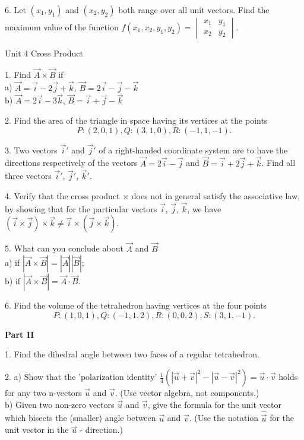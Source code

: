 \documentclass{article}
\begin{document}
6. Let $(x_{1}, y_{1})$ and $(x_{2}, y_{2})$ both range over all unit vectors.
Find the maximum value of the function $f(x_{1}, x_{2}, y_{1}, y_{2}) =
\begin{vmatrix}
x_{1} & y_{1} \\
x_{2} & y_{2}   
\end{vmatrix}$.

\bigskip

Unit 4 Cross Product

1. Find $\vec{A} \times \vec{B}$ if\\
a) $\vec{A} = \vec{i} - 2 \vec{j} + \vec{k}$, $\vec{B} = 2 \vec{i} - \vec{j} -
\vec{k}$ \\
b) $\vec{A} = 2 \vec{i} - 3 \vec{k}$, $\vec{B} = \vec{i} + \vec{j} - \vec{k}$

2. Find the area of the triangle in space having its vertices at the points
\[ P:(2,0,1), Q:(3,1,0), R:(-1,1,-1).\]

3. Two vectors $\vec{i}'$ and $\vec{j}'$ of a right-handed coordinate system
are to have the directions respectively of the vectors $\vec{A} = 2 \vec{i} -
\vec{j}$ and $\vec{B} = \vec{i} + 2 \vec{j} + \vec{k}$. Find all three vectors
$\vec{i}'$, $\vec{j}'$, $\vec{k}'$.

4. Verify that the cross product $\times$ does not in general satisfy the
associative law, by showing that for the particular vectors $\vec{i}$,
$\vec{j}$, $\vec{k}$, we have $(\vec{i} \times \vec{j}) \times \vec{k} \neq
\vec{i} \times (\vec{j} \times \vec{k})$.

5. What can you conclude about $\vec{A}$ and $\vec{B}$\\
a) if $|\vec{A} \times \vec{B}| = |\vec{A}||\vec{B}|$;\\
b) if $|\vec{A} \times \vec{B}| = \vec{A} \cdot \vec{B}$.

6. Find the volume of the tetrahedron having vertices at the four points
\[ P:(1,0,1), Q:(-1,1,2), R:(0,0,2), S:(3,1,-1).\]

\begin{center}
{\rmfamily\bfseries\large Part II}
\end{center}

1. Find the dihedral angle between two faces of a regular tetrahedron.

2. a) Show that the 'polarization identity'
$\frac{1}{4}\left( |\vec{u} + \vec{v}|^{2} - |\vec{u} - \vec{v}|^{2} \right) =
\vec{u} \cdot \vec{v}$ holds for any two n-vectors $\vec{u}$ and $\vec{v}$. (Use
vector algebra, not components.) \\
b) Given two non-zero vectors $\vec{u}$ and $\vec{v}$, give the formula for the
unit vector which bisects the (smaller) angle between $\vec{u}$ and $\vec{v}$.
(Use the notation $\hat{\vec{u}}$ for the unit vector in the $\vec{u}$ -
direction.)
\end{document}
